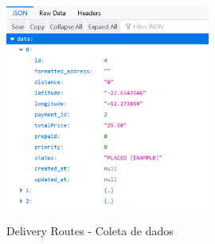 \begin{figure}[H]
    \centering
    \caption{Delivery Routes - Coleta de dados}
    \includegraphics[width=0.6\textwidth]{./dados/figuras/fig14}
    \label{fig:drPlacedAPI}
\end{figure}
